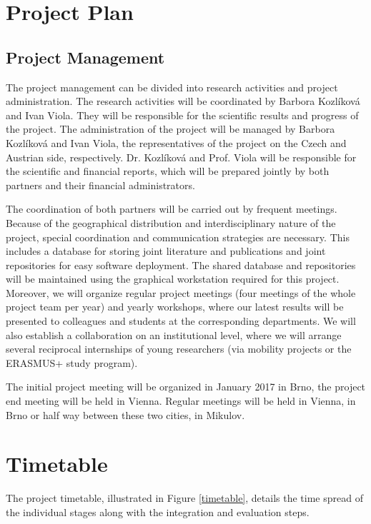 \documentclass[11pt,a4paper,titlepage,oneside,onecolumn]{article}
\begin{document}
\section{Project Plan}

\subsection{Project Management}
The project management can be divided into research activities and project administration.
The research activities will be coordinated by Barbora Kozl\'{i}kov\'{a} and Ivan Viola. 
They will be responsible for the scientific results and progress of the project.
The administration of the project will be managed by Barbora Kozl\'{i}kov\'{a} and Ivan Viola, the representatives of the project on the Czech and Austrian side, respectively. 
Dr. Kozl\'{i}kov\'{a} and Prof. Viola will be responsible for the scientific and financial reports, which will be prepared jointly by both partners and their financial administrators. 

The coordination of both partners will be carried out by frequent meetings. 
Because of the geographical distribution and interdisciplinary nature of the project, special coordination and communication strategies are necessary. 
This includes a database for storing joint literature and publications and joint repositories for easy software deployment. 
The shared database and repositories will be maintained using the graphical workstation required for this project. 
Moreover, we will organize regular project meetings (four meetings of the whole project team per year) and yearly workshops, where our latest results will be presented to colleagues and students at the corresponding departments. 
We will also establish a collaboration on an institutional level, where we will arrange several reciprocal internships of young researchers (via mobility projects or the ERASMUS+ study program). 
 
The initial project meeting will be organized in January 2017 in Brno, the project end meeting will be held in Vienna. 
Regular meetings will be held in Vienna, in Brno or half way between these two cities, in Mikulov.


\section{Timetable}
\label{sec:Timetable}

The project timetable, illustrated in Figure \ref{timetable}, details the time spread of the individual stages along with the integration and evaluation steps.
 
\end{document}
